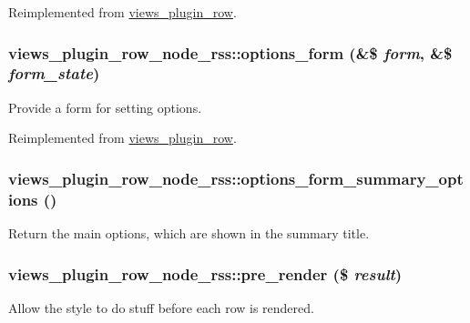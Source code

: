 Reimplemented from \hyperlink{classviews__plugin__row_abf02e5f51e907c5009edda15d997c161}{views\_\-plugin\_\-row}.\hypertarget{classviews__plugin__row__node__rss_a074125b7562bb918124c2dae6322f58e}{
\subsubsection[{options\_\-form}]{\setlength{\rightskip}{0pt plus 5cm}views\_\-plugin\_\-row\_\-node\_\-rss::options\_\-form (\&\$ {\em form}, \/  \&\$ {\em form\_\-state})}}
\label{classviews__plugin__row__node__rss_a074125b7562bb918124c2dae6322f58e}
Provide a form for setting options. 

Reimplemented from \hyperlink{classviews__plugin__row_a6914c39d64977a0aa71da39cc1af004e}{views\_\-plugin\_\-row}.\hypertarget{classviews__plugin__row__node__rss_a266e0776cfa7c86a98453b59215da8aa}{
\subsubsection[{options\_\-form\_\-summary\_\-options}]{\setlength{\rightskip}{0pt plus 5cm}views\_\-plugin\_\-row\_\-node\_\-rss::options\_\-form\_\-summary\_\-options ()}}
\label{classviews__plugin__row__node__rss_a266e0776cfa7c86a98453b59215da8aa}
Return the main options, which are shown in the summary title. \hypertarget{classviews__plugin__row__node__rss_a1306492166ea78aa60c5e199e5299260}{
\subsubsection[{pre\_\-render}]{\setlength{\rightskip}{0pt plus 5cm}views\_\-plugin\_\-row\_\-node\_\-rss::pre\_\-render (\$ {\em result})}}
\label{classviews__plugin__row__node__rss_a1306492166ea78aa60c5e199e5299260}
Allow the style to do stuff before each row is rendered.


